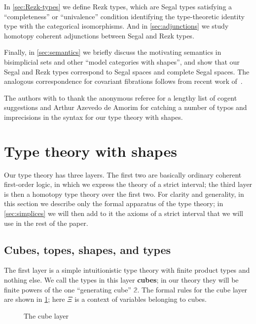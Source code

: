 \documentclass[12pt]{amsart}
\theoremstyle{plain}
\theoremstyle{definition}
\theoremstyle{remark}
\numberwithin{equation}{section}
\newcommand{\types}{\vdash}
\newcommand{\unittype}{\ensuremath{\mathbf{1}}}
\newcommand{\cube}{\;\mathsf{cube}}
\newcommand{\pair}[1]{\langle #1\rangle}
\newcommand{\two}{\mathbb{2}}
\begin{document}
In \cref{sec:Rezk-types} we define Rezk types, which are Segal types satisfying a ``completeness'' or ``univalence'' condition identifying the type-theoretic identity type with the categorical isomorphisms.
And in \cref{sec:adjunctions} we study homotopy coherent adjunctions between Segal and Rezk types.

Finally, in \cref{sec:semantics} we briefly discuss the motivating semantics in bisimplicial sets and other ``model categories with shapes'', and show that our Segal and Rezk types correspond to Segal spaces and complete Segal spaces.
The analogous correspondence for covariant fibrations follows from recent work of~\cite{RV4,kv:yoneda-css,boavida:segr,rasekh:yoneda-ss}.

The authors with to thank the anonymous referee for a lengthy list of cogent suggestions and Arthur Azevedo de Amorim for catching a number of typos and imprecisions in the syntax for our type theory with shapes.


\section{Type theory with shapes}
\label{sec:shape-type-theory}

Our type theory has three layers.
The first two are basically ordinary coherent first-order logic, in which we express the theory of a strict interval; the third layer is then a homotopy type theory over the first two.
For clarity and generality, in this section we describe only the formal apparatus of the type theory; in \cref{sec:simplices} we will then add to it the axioms of a strict interval that we will use in the rest of the paper.

\subsection{Cubes, topes, shapes, and types}

The first layer is a simple intuitionistic type theory with finite product types and nothing else.
We call the types in this layer \textbf{cubes}; in our theory they will be finite powers of the one ``generating cube'' $\two$.
The formal rules for the cube layer are shown in \cref{fig:cubes}; here $\Xi$ is a context of variables belonging to cubes.

\begin{figure}
  \centering
  \caption{The cube layer}
  \label{fig:cubes}
\end{figure}
\end{document}
